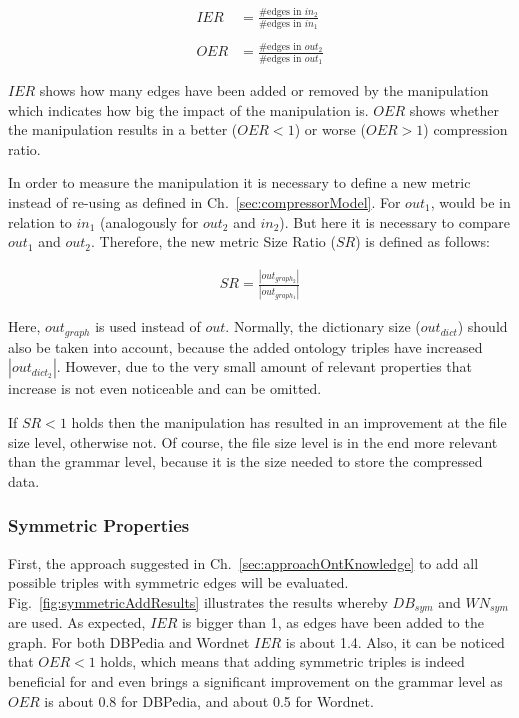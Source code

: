 \begin{align*}
IER&=\frac {\text{\#edges in } in_2} {\text{\#edges in  } in_1}
\\\\
OER&=\frac {\text{\#edges in } out_2} {\text{\#edges in } out_1}
 \end{align*}
 
$IER$ shows how many edges have been added or removed by the manipulation which indicates how big the impact of the manipulation is. $OER$  shows whether the manipulation results in a better ($OER<1$) or worse ($OER>1$) compression ratio.

In order to measure the manipulation it is necessary to define a new metric instead of re-using  as defined in Ch.~\ref{sec:compressorModel}. For $out_1$,  would be in relation to $in_1$ (analogously for $out_2$ and $in_2$). But here it is necessary to compare $out_1$ and $out_2$. Therefore, the new metric Size Ratio ($SR$) is defined as follows:

\begin{align*} 
SR=\frac {|out_{graph_2}|} {|out_{graph_1}|}
\end{align*}

Here, $out_{graph}$ is used instead of $out$. Normally, the dictionary size ($out_{dict}$) should also be taken into account, because the added ontology triples have increased $|out_{dict_2}|$. However, due to the very small amount of relevant properties that increase is not even noticeable and can be omitted. 

If $SR<1$ holds then the manipulation has resulted in an improvement at the file size level, otherwise not. Of course, the file size level is in the end more relevant than the grammar level, because it is the size needed to store the compressed data.



\subsubsection{Symmetric Properties}

First, the approach suggested in Ch.~\ref{sec:approachOntKnowledge} to add all possible triples with symmetric edges will be evaluated. Fig.~\ref{fig:symmetricAddResults} illustrates the results whereby $DB_{sym}$ and $WN_{sym}$ are used. As expected, $IER$ is bigger than 1, as edges have been added to the graph. For both DBPedia and Wordnet $IER$ is about 1.4. Also, it can be noticed that $OER<1$ holds, which means that adding symmetric triples is indeed beneficial for \GGRP{} and even brings a significant improvement on the grammar level as $OER$ is about 0.8 for DBPedia, and about 0.5 for Wordnet.

